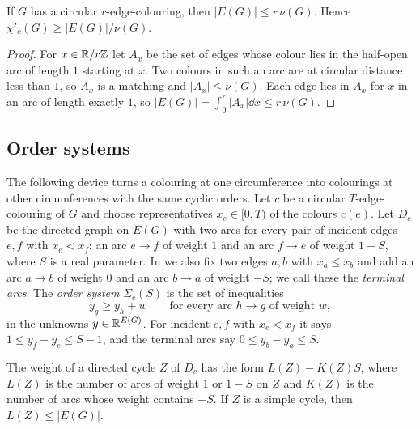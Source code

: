 \documentclass[11pt,colorlinks]{charlie}
\newcommand{\cind}{\chi'_c}
\begin{document}
\begin{lemma}\label{lem:matching}
If $G$ has a circular $r$-edge-colouring, then $|E(G)|\le r\,\nu(G)$. Hence $\cind(G)\ge|E(G)|/\nu(G)$.
\end{lemma}

\begin{proof}
For $x\in\mathbb{R}/r\mathbb{Z}$ let $A_x$ be the set of edges whose colour lies in the half-open arc of length $1$ starting at $x$. Two colours in such an arc are at circular distance less than $1$, so $A_x$ is a matching and $|A_x|\le\nu(G)$. Each edge lies in $A_x$ for $x$ in an arc of length exactly $1$, so $|E(G)|=\int_0^r|A_x|\dd x\le r\,\nu(G)$.
\end{proof}

\subsection{Order systems}

The following device turns a colouring at one circumference into colourings at other circumferences with the same cyclic orders. Let $c$ be a circular $T$-edge-colouring of $G$ and choose representatives $x_e\in[0,T)$ of the colours $c(e)$. Let $D_c$ be the directed graph on $E(G)$ with two arcs for every pair of incident edges $e,f$ with $x_e<x_f$: an arc $e\to f$ of weight $1$ and an arc $f\to e$ of weight $1-S$, where $S$ is a real parameter. In  we also fix two edges $a,b$ with $x_a\le x_b$ and add an arc $a\to b$ of weight $0$ and an arc $b\to a$ of weight $-S$; we call these the \emph{terminal arcs}. The \emph{order system} $\Sigma_c(S)$ is the set of inequalities
\[
y_g\ge y_h+w\qquad\text{for every arc }h\to g\text{ of weight }w,
\]
in the unknowns $y\in\mathbb{R}^{E(G)}$. For incident $e,f$ with $x_e<x_f$ it says $1\le y_f-y_e\le S-1$, and the terminal arcs say $0\le y_b-y_a\le S$.

The weight of a directed cycle $Z$ of $D_c$ has the form $L(Z)-K(Z)S$, where $L(Z)$ is the number of arcs of weight $1$ or $1-S$ on $Z$ and $K(Z)$ is the number of arcs whose weight contains $-S$. If $Z$ is a simple cycle, then $L(Z)\le|E(G)|$.
\end{document}
